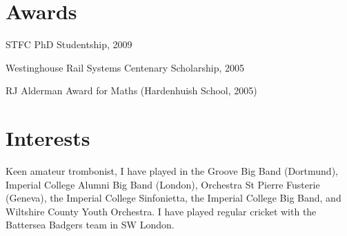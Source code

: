 \documentclass[10pt]{article}
\renewenvironment{compactitem}{
  \begin{list}{}{
    \setlength{\leftmargin}{1.5em}
  }
}{
  \end{list}
}
\begin{document}
\section*{Awards}
\begin{compactitem}
\item STFC PhD Studentship, 2009
\item Westinghouse Rail Systems Centenary Scholarship, 2005
\item RJ Alderman Award for Maths (Hardenhuish School, 2005)
\end{compactitem}

\section*{Interests}
Keen amateur trombonist, I have played in the Groove Big Band (Dortmund), Imperial College Alumni Big Band (London), Orchestra St Pierre Fusterie (Geneva), the Imperial College Sinfonietta, the Imperial College Big Band, and Wiltshire County Youth Orchestra. I have played regular cricket with the Battersea Badgers team in SW London.

%

\end{document}
